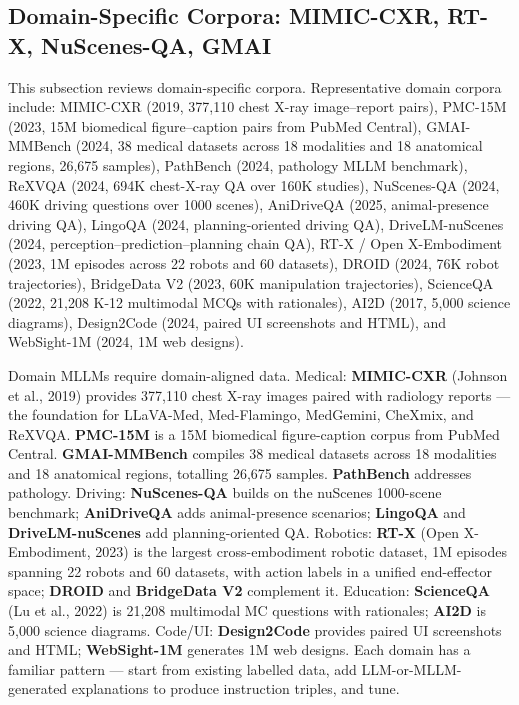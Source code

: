 \documentclass{article}
\begin{document}
\subsection{Domain-Specific Corpora: MIMIC-CXR, RT-X, NuScenes-QA, GMAI}\label{domain-specific-corpora-mimic-cxr-rt-x-nuscenes-qa-gmai}

This subsection reviews domain-specific corpora. Representative domain corpora include: MIMIC-CXR (2019, 377,110 chest X-ray image--report pairs), PMC-15M (2023, 15M biomedical figure--caption pairs from PubMed Central), GMAI-MMBench (2024, 38 medical datasets across 18 modalities and 18 anatomical regions, 26,675 samples), PathBench (2024, pathology MLLM benchmark), ReXVQA (2024, 694K chest-X-ray QA over 160K studies), NuScenes-QA (2024, 460K driving questions over 1000 scenes), AniDriveQA (2025, animal-presence driving QA), LingoQA (2024, planning-oriented driving QA), DriveLM-nuScenes (2024, perception--prediction--planning chain QA), RT-X / Open X-Embodiment (2023, 1M episodes across 22 robots and 60 datasets), DROID (2024, 76K robot trajectories), BridgeData V2 (2023, 60K manipulation trajectories), ScienceQA (2022, 21,208 K-12 multimodal MCQs with rationales), AI2D (2017, 5,000 science diagrams), Design2Code (2024, paired UI screenshots and HTML), and WebSight-1M (2024, 1M web designs).

Domain MLLMs require domain-aligned data. Medical: \textbf{MIMIC-CXR} (Johnson et al., 2019) provides 377,110 chest X-ray images paired with radiology reports --- the foundation for LLaVA-Med, Med-Flamingo, MedGemini, CheXmix, and ReXVQA. \textbf{PMC-15M} is a 15M biomedical figure-caption corpus from PubMed Central. \textbf{GMAI-MMBench} \citep{chen20242024} compiles 38 medical datasets across 18 modalities and 18 anatomical regions, totalling 26,675 samples. \textbf{PathBench} addresses pathology. Driving: \textbf{NuScenes-QA} \citep{qian20242024} builds on the nuScenes 1000-scene benchmark; \textbf{AniDriveQA} \citep{wang20242024} adds animal-presence scenarios; \textbf{LingoQA} and \textbf{DriveLM-nuScenes} add planning-oriented QA. Robotics: \textbf{RT-X} (Open X-Embodiment, 2023) is the largest cross-embodiment robotic dataset, 1M episodes spanning 22 robots and 60 datasets, with action labels in a unified end-effector space; \textbf{DROID} and \textbf{BridgeData V2} complement it. Education: \textbf{ScienceQA} (Lu et al., 2022) is 21,208 multimodal MC questions with rationales; \textbf{AI2D} is 5,000 science diagrams. Code/UI: \textbf{Design2Code} \citep{si20242024} provides paired UI screenshots and HTML; \textbf{WebSight-1M} generates 1M web designs. Each domain has a familiar pattern --- start from existing labelled data, add LLM-or-MLLM-generated explanations to produce instruction triples, and tune.
\end{document}
